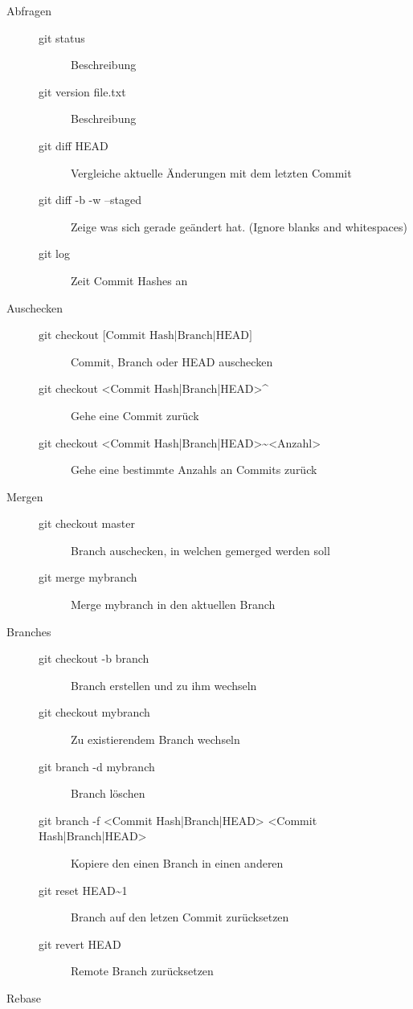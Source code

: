 \begin{description}
	\item[Abfragen] \hfill
	\begin{description}
		\item[git status] Beschreibung
		\item[git version file.txt] Beschreibung
		\item[git diff HEAD] Vergleiche aktuelle Änderungen mit dem letzten Commit
		\item[git diff -b -w --staged] Zeige was sich gerade geändert hat. (Ignore blanks and whitespaces)
		\item[git log] Zeit Commit Hashes an
	\end{description}
	\item[Auschecken] \hfill
	\begin{description}
		\item[$\text{git checkout [Commit Hash|Branch|HEAD]}$ ] Commit, Branch oder HEAD auschecken
		\item[git checkout <Commit Hash|Branch|HEAD>\textasciicircum] Gehe eine Commit zurück
		\item[git checkout <Commit Hash|Branch|HEAD>\textasciitilde<Anzahl>] Gehe eine bestimmte Anzahls an Commits zurück
	\end{description}
	\item[Mergen] \hfill
	\begin{description}
		\item[git checkout master] Branch auschecken, in welchen gemerged werden soll
		\item[git merge mybranch] Merge mybranch in den aktuellen Branch
	\end{description}
	\newpage
	\item[Branches] \hfill
	\begin{description}
		\item[git checkout -b branch] Branch erstellen und zu ihm wechseln
		\item[git checkout mybranch] Zu existierendem Branch wechseln
		\item[git branch -d mybranch] Branch löschen
		\item[git branch -f <Commit Hash|Branch|HEAD> <Commit Hash|Branch|HEAD>] Kopiere den einen Branch in einen anderen
		\item[git reset HEAD\textasciitilde1] Branch auf den letzen Commit zurücksetzen
		\item[git revert HEAD] Remote Branch zurücksetzen 
	\end{description}
	\item[Rebase] \hfill

\end{description}
